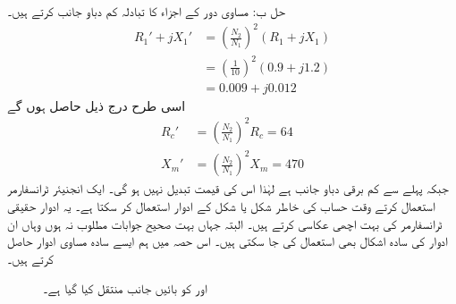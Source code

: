 حل ب:\quad
مساوی دور کے اجزاء کا تبادلہ کم دباو جانب کرتے ہیں۔
\begin{align*}
R_1'+j X_1' &=\left(\frac{N_2}{N_1} \right)^2 \left(R_1+j X_1 \right)\\
&=\left(\frac{1}{10} \right)^2 \left(0.9+j1.2 \right)\\
&=0.009+j0.012
\end{align*}
اسی طرح درج ذیل حاصل ہوں گے
\begin{align*}
R_c'&=\left(\frac{N_2}{N_1} \right)^2 R_c=64\\
X_m'&=\left(\frac{N_2}{N_1} \right)^2 X_m=470
\end{align*}
جبکہ  پہلے سے کم برقی دباو جانب ہے لہٰذا اس کی قیمت تبدیل نہیں ہو گی۔
%
ایک انجنیئر  ٹرانسفارمر استعمال کرتے وقت حساب کی خاطر شکل  یا شکل  کے ادوار استعمال کر سکتا ہے۔ یہ ادوار حقیقی ٹرانسفارمر کی بہت اچھی عکاسی کرتے ہیں۔ البتہ جہاں بہت صحیح جوابات مطلوب نہ ہوں وہاں ان ادوار کی سادہ اشکال بھی استعمال کی جا سکتی ہیں۔ اس حصہ میں ہم ایسے  سادہ مساوی ادوار حاصل کرتے ہیں۔
\begin{figure}
\centering
\caption{ اور  کو بائیں جانب منتقل کیا گیا ہے۔}
\label{شکل_ٹرانسفارمر_بائیں_جانب}
\end{figure}
